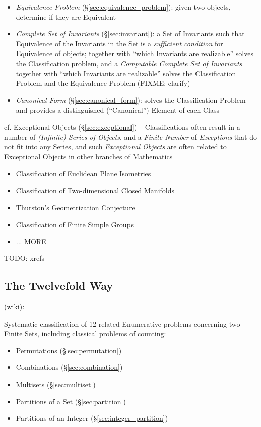 \begin{itemize}
  \item \emph{Equivalence Problem} (\S\ref{sec:equivalence_problem}): given two
    objects, determine if they are Equivalent
  \item \emph{Complete Set of Invariants} (\S\ref{sec:invariant}): a Set of
    Invariants such that Equivalence of the Invariants in the Set is a
    \emph{sufficient condition} for Equivalence of objects; together with
    ``which Invariants are realizable'' solves the Classification problem, and a
    \emph{Computable Complete Set of Invariants} together with ``which
    Invariants are realizable'' solves the Classification Problem and the
    Equivalence Problem (FIXME: clarify)
  \item \emph{Canonical Form} (\S\ref{sec:canonical_form}): solves the
    Classification Problem and provides a distinguished (``Canonical'') Element
    of each Class
\end{itemize}

cf. Exceptional Objects (\S\ref{sec:exceptional}) -- Classifications often
result in a number of \emph{(Infinite) Series of Objects}, and a \emph{Finite
  Number} of \emph{Exceptions} that do not fit into any Series, and such
\emph{Exceptional Objects} are often related to Exceptional Objects in other
branches of Mathematics

\begin{itemize}
  \item Classification of Euclidean Plane Isometries
  \item Classification of Two-dimensional Closed Manifolds
  \item Thurston's Geometrization Conjecture
  \item Classification of Finite Simple Groups
  \item ... MORE
\end{itemize}

TODO: xrefs



\subsection{The Twelvefold Way}\label{sec:twelvefold_way}

(wiki):

Systematic classification of 12 related Enumerative problems concerning two
Finite Sets, including classical problems of counting:
\begin{itemize}
  \item Permutations (\S\ref{sec:permutation})
  \item Combinations (\S\ref{sec:combination})
  \item Multisets (\S\ref{sec:multiset})
  \item Partitions of a Set (\S\ref{sec:partition})
  \item Partitions of an Integer (\S\ref{sec:integer_partition})
\end{itemize}

